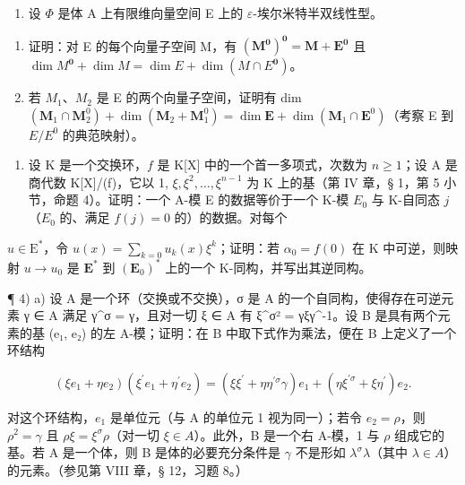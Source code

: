 \begin{enumerate}
\def\labelenumi{\arabic{enumi})}
\setcounter{enumi}{1}
\tightlist
\item
  设 \(\Phi\) 是体 A 上有限维向量空间 E 上的 \(\varepsilon\)-埃尔米特半双线性型。
\end{enumerate}

\begin{enumerate}
\def\labelenumi{\alph{enumi})}
\item
  证明：对 E 的每个向量子空间 M，有 \((\mathbf{M}^{\mathbf{0}})^{\mathbf{0}} = \mathbf{M} + \mathbf{E}^{\mathbf{0}}\) 且 \(\dim M^{\mathbf{0}} + \dim M = \dim E + \dim (M \cap E^{\mathbf{0}})\)。
\item
  若 \(M_{1}\)、\(M_{2}\) 是 E 的两个向量子空间，证明有 dim \((\mathbf{M}_{1} \cap \mathbf{M}_{2}^{0}) + \dim (\mathbf{M}_{2} + \mathbf{M}_{1}^{0}) = \dim \mathbf{E} + \dim (\mathbf{M}_{1} \cap \mathbf{E}^{0})\)（考察 E 到 \(E/E^{0}\) 的典范映射）。
\end{enumerate}

\begin{enumerate}
\def\labelenumi{\arabic{enumi})}
\setcounter{enumi}{2}
\tightlist
\item
  设 K 是一个交换环，\(f\) 是 K{[}X{]} 中的一个首一多项式，次数为 \(n \geqslant 1\)；设 A 是商代数 K{[}X{]}/(f)，它以 1, \(\xi, \xi^2, \ldots, \xi^{n-1}\) 为 K 上的基（第 IV 章，§ 1，第 5 小节，命题 4）。证明：一个 A-模 E 的数据等价于一个 K-模 \(E_0\) 与 K-自同态 \(j\) （\(E_0\) 的、满足 \(f(j) = 0\) 的）的数据。对每个
\end{enumerate}

\(u \in \mathrm{E}^*\)，令 \(u(x) = \sum_{k=0} u_k(x)\xi^k\)；证明：若 \(\alpha_0 = f(0)\) 在 K 中可逆，则映射 \(u \to u_0\) 是 \(\mathbf{E}^*\) 到 \((\mathbf{E}_0)^*\) 上的一个 K-同构，并写出其逆同构。

¶ 4) a) 设 A 是一个环（交换或不交换），σ 是 A 的一个自同构，使得存在可逆元素 γ ∈ A 满足 γ\^{}σ = γ，且对一切 ξ ∈ A 有 ξ\^{}σ² = γξγ\^{}-1。设 B 是具有两个元素的基 (e₁, e₂) 的左 A-模；证明：在 B 中取下式作为乘法，便在 B 上定义了一个环结构

\[
(\xi e _ {1} + \eta e _ {2}) (\xi^ {\prime} e _ {1} + \eta^ {\prime} e _ {2}) = (\xi \xi^ {\prime} + \eta \eta^ {\prime \sigma} \gamma) e _ {1} + (\eta \xi^ {\prime \sigma} + \xi \eta^ {\prime}) e _ {2}.
\]

对这个环结构，\(e_1\) 是单位元（与 A 的单位元 1 视为同一）；若令 \(e_2 = \rho\)，则 \(\rho^2 = \gamma\) 且 \(\rho\xi = \xi^\sigma\rho\)（对一切 \(\xi \in A\)）。此外，B 是一个右 A-模，1 与 \(\rho\) 组成它的基。若 A 是一个体，则 B 是体的必要充分条件是 \(\gamma\) 不是形如 \(\lambda^\sigma\lambda\)（其中 \(\lambda \in A\)）的元素。（参见第 VIII 章，§ 12，习题 8。）

